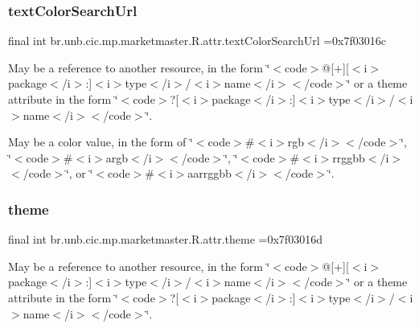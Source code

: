 \subsubsection{\texorpdfstring{text\+Color\+Search\+Url}{textColorSearchUrl}}
{\footnotesize\ttfamily final int br.\+unb.\+cic.\+mp.\+marketmaster.\+R.\+attr.\+text\+Color\+Search\+Url =0x7f03016c\hspace{0.3cm}{\ttfamily [static]}}

May be a reference to another resource, in the form \char`\"{}$<$code$>$@\mbox{[}+\mbox{]}\mbox{[}$<$i$>$package$<$/i$>$\+:\mbox{]}$<$i$>$type$<$/i$>$/$<$i$>$name$<$/i$>$$<$/code$>$\char`\"{} or a theme attribute in the form \char`\"{}$<$code$>$?\mbox{[}$<$i$>$package$<$/i$>$\+:\mbox{]}$<$i$>$type$<$/i$>$/$<$i$>$name$<$/i$>$$<$/code$>$\char`\"{}. 

May be a color value, in the form of \char`\"{}$<$code$>$\#$<$i$>$rgb$<$/i$>$$<$/code$>$\char`\"{}, \char`\"{}$<$code$>$\#$<$i$>$argb$<$/i$>$$<$/code$>$\char`\"{}, \char`\"{}$<$code$>$\#$<$i$>$rrggbb$<$/i$>$$<$/code$>$\char`\"{}, or \char`\"{}$<$code$>$\#$<$i$>$aarrggbb$<$/i$>$$<$/code$>$\char`\"{}. \mbox{\label{classbr_1_1unb_1_1cic_1_1mp_1_1marketmaster_1_1R_1_1attr_ae1fc06a93145662b5748205584a1fc2e}} 
\subsubsection{\texorpdfstring{theme}{theme}}
{\footnotesize\ttfamily final int br.\+unb.\+cic.\+mp.\+marketmaster.\+R.\+attr.\+theme =0x7f03016d\hspace{0.3cm}{\ttfamily [static]}}

May be a reference to another resource, in the form \char`\"{}$<$code$>$@\mbox{[}+\mbox{]}\mbox{[}$<$i$>$package$<$/i$>$\+:\mbox{]}$<$i$>$type$<$/i$>$/$<$i$>$name$<$/i$>$$<$/code$>$\char`\"{} or a theme attribute in the form \char`\"{}$<$code$>$?\mbox{[}$<$i$>$package$<$/i$>$\+:\mbox{]}$<$i$>$type$<$/i$>$/$<$i$>$name$<$/i$>$$<$/code$>$\char`\"{}. \mbox{\label{classbr_1_1unb_1_1cic_1_1mp_1_1marketmaster_1_1R_1_1attr_ae8f804fa4efec8a67e55a3683deeadac}} 
